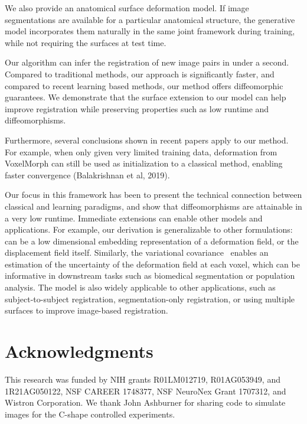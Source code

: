 \documentclass{article}
\begin{document}
We also provide an anatomical surface deformation model. If image segmentations are available for a particular anatomical structure, the generative model incorporates them naturally in the same joint framework during training, while not requiring the surfaces at test time. 



Our algorithm can infer the registration of new image pairs in under a second. Compared to traditional methods, our approach is significantly faster, and compared to recent learning based methods, our method offers diffeomorphic guarantees. We demonstrate that the surface extension to our model can help improve registration while preserving properties such as low runtime and diffeomorphisms. 


{\color{blue} Furthermore, several conclusions shown in recent papers apply to our method. For example, when only given very limited training data, deformation from VoxelMorph can still be used as initialization to a classical method, enabling faster convergence (Balakrishnan et al, 2019).}

Our focus in this framework has been to present the technical connection between classical and learning paradigms, and show that diffeomorphisms are attainable in a very low runtime. Immediate extensions can enable other models and applications. For example, our derivation is generalizable to other formulations:~ can be a low dimensional embedding representation of a deformation field, or the displacement field itself. Similarly, the variational covariance~ enables an estimation of the uncertainty of the deformation field at each voxel, which can be informative in downstream tasks such as biomedical segmentation or population analysis. The model is also widely applicable to other applications, such as subject-to-subject registration, segmentation-only registration, or using multiple surfaces to improve image-based registration. 


\vspace{-0.15cm}
\section{Acknowledgments}
\vspace{-0.1cm}
This research was funded by NIH grants R01LM012719, R01AG053949, and 1R21AG050122, NSF CAREER 1748377, NSF NeuroNex Grant 1707312, and Wistron Corporation. {\color{blue} We thank John Ashburner for sharing code to simulate images for the C-shape controlled experiments.} 
\end{document}
